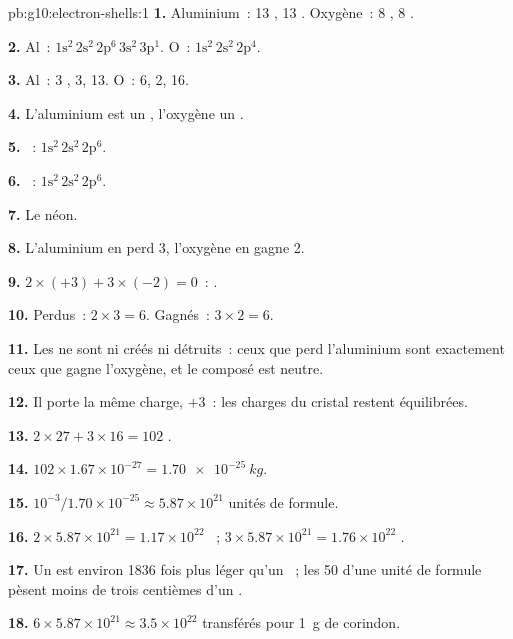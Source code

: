 \begin{solution}{pb:g10:electron-shells:1}
\textbf{1.} Aluminium~: 13 , 13 . Oxygène~: 8 , 8
.

\textbf{2.} Al~: $1\mathrm{s}^2\,2\mathrm{s}^2\,2\mathrm{p}^6\,3\mathrm{s}^2\,3\mathrm{p}^1$.
O~: $1\mathrm{s}^2\,2\mathrm{s}^2\,2\mathrm{p}^4$.

\textbf{3.} Al~: 3 ,  3,  13. O~: 6,
 2,  16.

\textbf{4.} L'aluminium est un , l'oxygène un .

\textbf{5.} ~: $1\mathrm{s}^2\,2\mathrm{s}^2\,2\mathrm{p}^6$.

\textbf{6.} ~: $1\mathrm{s}^2\,2\mathrm{s}^2\,2\mathrm{p}^6$.

\textbf{7.} Le néon.

\textbf{8.} L'aluminium en perd 3, l'oxygène en gagne 2.

\textbf{9.} $2 \times (+3) + 3 \times (-2) = 0$~: .

\textbf{10.} Perdus~: $2 \times 3 = 6$. Gagnés~: $3 \times 2 = 6$.

\textbf{11.} Les  ne sont ni créés ni détruits~: ceux que perd
l'aluminium sont exactement ceux que gagne l'oxygène, et le composé est
neutre.

\textbf{12.} Il porte la même charge, $+3$~: les charges du cristal
restent équilibrées.

\textbf{13.} $2 \times 27 + 3 \times 16 = 102$ .

\textbf{14.} $102 \times 1.67 \times 10^{-27} = \qty{1.70e-25}{kg}$.

\textbf{15.} $10^{-3} / 1.70 \times 10^{-25} \approx 5.87 \times 10^{21}$
unités de formule.

\textbf{16.} $2 \times 5.87 \times 10^{21} = 1.17 \times 10^{22}$ 
~; $3 \times 5.87 \times 10^{21} = 1.76 \times 10^{22}$ 
.

\textbf{17.} Un  est environ 1836 fois plus léger qu'un ~;
les 50  d'une unité de formule pèsent moins de trois centièmes
d'un .

\textbf{18.} $6 \times 5.87 \times 10^{21} \approx 3.5 \times 10^{22}$
 transférés pour \qty{1}{g} de corindon.
\end{solution}
